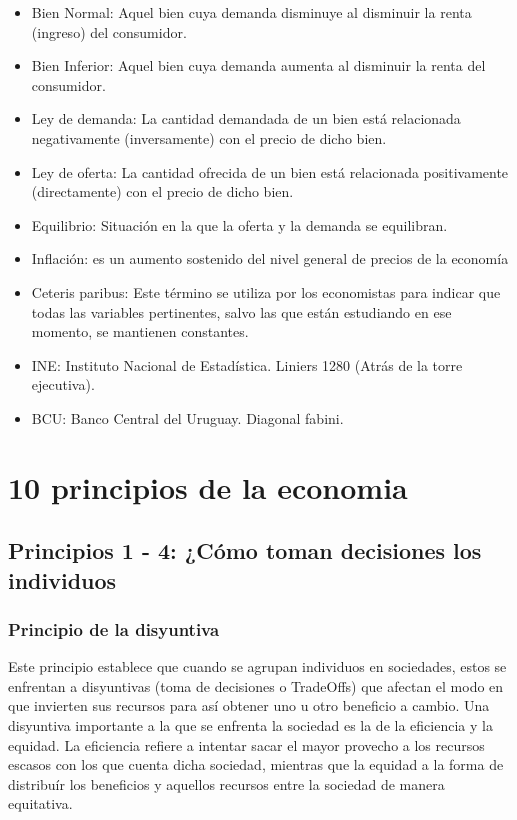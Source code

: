 \documentclass{report}
\begin{document}
\begin{itemize}
	\item Bien Normal: Aquel bien cuya demanda disminuye al disminuir la renta (ingreso) del consumidor.

	\item Bien Inferior: Aquel bien cuya demanda aumenta al disminuir la renta del consumidor.

	\item Ley de demanda: La cantidad demandada de un bien está relacionada negativamente (inversamente) con el precio de dicho bien.

	\item Ley de oferta: La cantidad ofrecida de un bien está relacionada positivamente (directamente) con el precio de dicho bien.

	\item Equilibrio: Situación en la que la oferta y la demanda se equilibran.

	\item Inflación: es un aumento sostenido del nivel general de precios de la economía

	\item Ceteris paribus: Este término se utiliza por los economistas para indicar que todas las variables pertinentes, salvo las que están estudiando en ese momento, se mantienen constantes.

	\item INE: Instituto Nacional de Estadística. Liniers 1280 (Atrás de la torre ejecutiva).

	\item BCU: Banco Central del Uruguay. Diagonal fabini.
\end{itemize}

\chapter{10 principios de la economia}

\section{Principios 1 - 4: ¿Cómo toman decisiones los individuos}
\subsection{Principio de la disyuntiva}
Este principio establece que cuando se agrupan individuos en sociedades, estos se enfrentan a disyuntivas (toma de decisiones o TradeOffs) que afectan el modo en que invierten sus recursos para así obtener uno u otro beneficio a cambio. Una disyuntiva importante a la que se enfrenta la sociedad es la de la eficiencia y la equidad. La eficiencia refiere a intentar sacar el mayor provecho a los recursos escasos con los que cuenta dicha sociedad, mientras que la equidad a la forma de distribuír los beneficios y aquellos recursos entre la sociedad de manera equitativa.
\end{document}
